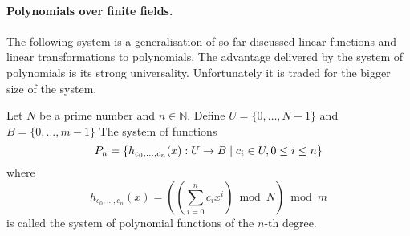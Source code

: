\paragraph{Polynomials over finite fields.}
The following system is a generalisation of so far discussed linear functions and linear transformations to polynomials. The advantage delivered by the system of polynomials is its strong universality. Unfortunately it is traded for the bigger size of the system.

\begin{definition}
Let $N$ be a prime number and $n \in \mathbb{N}$. Define $U = \{0, \dots, N - 1 \}$ and $B = \{0, \dots, m - 1\}$ The system of functions \[ P_n = \left\lbrace h_{c_0, \dots, c_n}(x): U \rightarrow B \mid c_i \in U, 0 \leq i \leq n \right\rbrace \] where \[ h_{c_0, \dots, c_n}(x) = \left( \left(\displaystyle \sum_{i=0}^{n} c_i x^i \right) \bmod N \right) \bmod m \] is called the system of polynomial functions of the $n$-th degree.
\end{definition}

